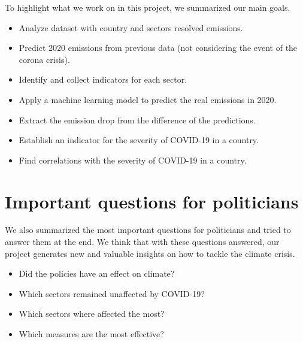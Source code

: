 To highlight what we work on in this project, we summarized our main goals.

\begin{itemize}
	\item Analyze dataset with country and sectors resolved \co emissions.
	\item Predict 2020 emissions from previous data (not considering the event of the corona crisis).
	\item Identify and collect indicators for each sector.
	\item Apply a machine learning model to predict the real \co emissions in 2020.
	\item Extract the \co emission drop from the difference of the predictions.
	\item Establish an indicator for the severity of COVID-19 in a country.
	\item Find correlations with the severity of COVID-19 in a country.
\end{itemize}

\section*{Important questions for politicians}

We also summarized the most important questions for politicians and tried to answer them at the end. We think that with these questions answered, our project generates new and valuable insights on how to tackle the climate crisis.

\begin{itemize}
	\item Did the policies have an effect on climate?
	\item Which sectors remained unaffected by COVID-19?
	\item Which sectors where affected the most?
	\item Which measures are the most effective?
\end{itemize}